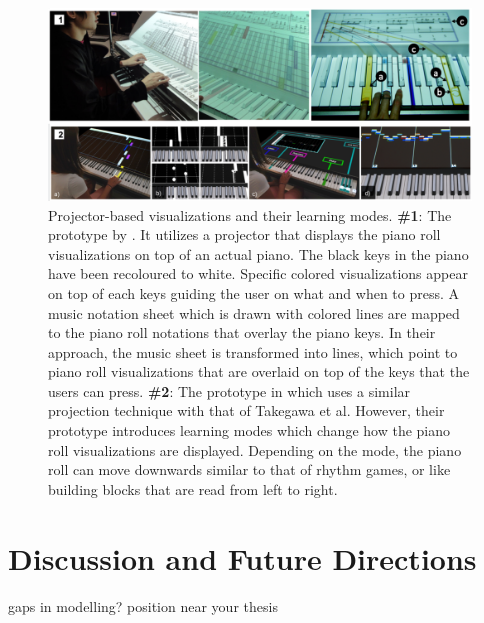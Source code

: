 \documentclass[manuscript,screen]{acmart}
\begin{document}
\begin{figure}[t]
    \centering
    \includegraphics[width=15cm]{figures/projectors.png}
    \caption{Projector-based visualizations and their learning modes.  \textbf{\#1}: The prototype by \cite{takegawa2012piano}. It utilizes a projector that displays the piano roll visualizations on top of an actual piano. The black keys in the piano have been recoloured to white. Specific colored visualizations appear on top of each keys guiding the user on what and when to press. A music notation sheet which is drawn with colored lines are mapped to the piano roll notations that overlay the piano keys. In their approach, the music sheet is transformed into lines, which point to piano roll visualizations that are overlaid on top of the keys that the users can press. \textbf{\#2}: The prototype in \cite{rogers2014piano} which uses a similar projection technique with that of Takegawa et al. However, their prototype introduces learning modes which change how the piano roll visualizations are displayed. Depending on the mode, the piano roll can move downwards similar to that of rhythm games, or like building blocks that are read from left to right. }
    \label{fig:projectors}
\end{figure}


\section{Discussion and Future Directions}
\label{sec: discuss}
gaps in modelling? position near your thesis
\end{document}
